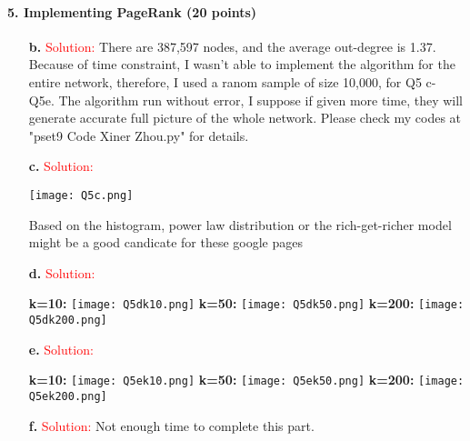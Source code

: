 \documentclass[11pt]{article} %
\begin{document}
\paragraph{5. Implementing PageRank (20 points)}
 
\begin{itemize}
    \item[\textbf{b. }]\textcolor{red}{Solution:}  
 There are 387,597 nodes, and the average out-degree is 1.37. Because of time constraint, I wasn't able to implement the algorithm for the entire network, therefore, I used a ranom sample of size 10,000, for Q5 c- Q5e. The algorithm run without error, I suppose if given more time, they will generate accurate full picture of the whole network. Please check my codes at "pset9 Code Xiner Zhou.py" for details.

    \item[\textbf{c. }]\textcolor{red}{Solution:}  
\begin{center}
\texttt{[image: Q5c.png]}
\end{center}
Based on the histogram, power law distribution or the rich-get-richer model might be a good candicate for these google pages
    \item[\textbf{d. }]\textcolor{red}{Solution:} 
\begin{center}
\textbf{k=10:}
\texttt{[image: Q5dk10.png]}
\textbf{k=50:}
\texttt{[image: Q5dk50.png]}
\textbf{k=200:}
\texttt{[image: Q5dk200.png]}
\end{center}
    \item[\textbf{e. }]\textcolor{red}{Solution:} 
\begin{center}
\textbf{k=10:}
\texttt{[image: Q5ek10.png]}
\textbf{k=50:}
\texttt{[image: Q5ek50.png]}
\textbf{k=200:}
\texttt{[image: Q5ek200.png]}
\end{center}

    \item[\textbf{f. }]\textcolor{red}{Solution:}  
Not enough time to complete this part.
\end{itemize}
 
 
\end{document}
